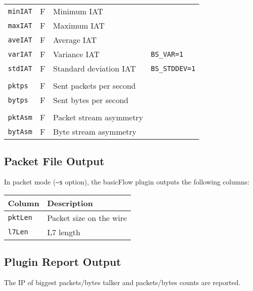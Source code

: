 \documentclass[documentation]{subfiles}
\begin{document}
\begin{longtable}{llll}
    {\tt minIAT}     &   F & Minimum IAT\\
    {\tt maxIAT}     &   F & Maximum IAT\\
    {\tt aveIAT}     &   F & Average IAT\\
    {\tt varIAT}     &   F & Variance IAT           & {\tt BS\_VAR=1}\\
    {\tt stdIAT}     &   F & Standard deviation IAT & {\tt BS\_STDDEV=1}\\\\

    {\tt pktps}      &   F & Sent packets per second\\
    {\tt bytps}      &   F & Sent bytes per second\\\\

    {\tt pktAsm}     &   F & Packet stream asymmetry\\
    {\tt bytAsm}     &   F & Byte stream asymmetry\\
    \bottomrule
\end{longtable}

\subsection{Packet File Output}
In packet mode ({\tt --s} option), the basicFlow plugin outputs the following columns:
\begin{longtable}{ll}
    \toprule
    {\bf Column} & {\bf Description}\\%
    \midrule\endhead%
    {\tt pktLen} & Packet size on the wire\\
    {\tt l7Len}  & L7 length\\
    \bottomrule
\end{longtable}

\subsection{Plugin Report Output}
The IP of biggest packets/bytes talker and packets/bytes counts are reported.

%
%
%
\end{document}
